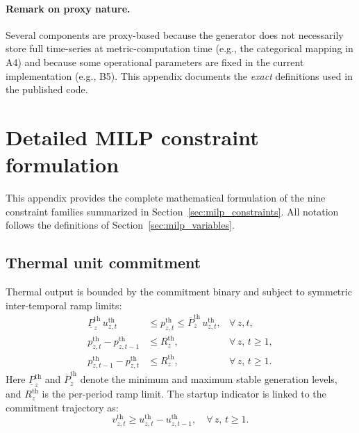 \documentclass{article}
\begin{document}
\paragraph{Remark on proxy nature.}
Several components are proxy-based because the generator does not necessarily store full time-series at metric-computation time (e.g., the categorical mapping in A4) and because some operational parameters are fixed in the current implementation (e.g., B5).
This appendix documents the \emph{exact} definitions used in the published code.



\section{Detailed MILP constraint formulation}
\label{app:milp_constraints}

This appendix provides the complete mathematical formulation of the nine constraint families summarized in Section~\ref{sec:milp_constraints}. All notation follows the definitions of Section~\ref{sec:milp_variables}.

\subsection{Thermal unit commitment}

Thermal output is bounded by the commitment binary and subject to symmetric inter-temporal ramp limits:
\begin{align}
\underline{P}^{\mathrm{th}}_z \, u^{\mathrm{th}}_{z,t}
&\leq p^{\mathrm{th}}_{z,t}
\leq \overline{P}^{\mathrm{th}}_z \, u^{\mathrm{th}}_{z,t},
& \forall\, z,t, \label{eq:thermal_bounds} \\
p^{\mathrm{th}}_{z,t} - p^{\mathrm{th}}_{z,t-1}
&\leq R^{\mathrm{th}}_z,
& \forall\, z,\, t \geq 1, \label{eq:thermal_ramp_up} \\
p^{\mathrm{th}}_{z,t-1} - p^{\mathrm{th}}_{z,t}
&\leq R^{\mathrm{th}}_z,
& \forall\, z,\, t \geq 1. \label{eq:thermal_ramp_down}
\end{align}
Here $\underline{P}^{\mathrm{th}}_z$ and $\overline{P}^{\mathrm{th}}_z$ denote the minimum and maximum stable generation levels, and $R^{\mathrm{th}}_z$ is the per-period ramp limit.
The startup indicator is linked to the commitment trajectory as:
\begin{equation}
v^{\mathrm{th}}_{z,t} \geq u^{\mathrm{th}}_{z,t} - u^{\mathrm{th}}_{z,t-1},
\quad \forall\, z,\, t \geq 1.
\label{eq:thermal_startup}
\end{equation}
\end{document}
